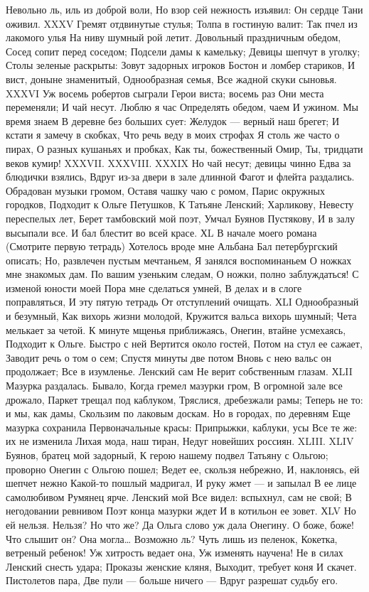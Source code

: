 Невольно ль, иль из доброй воли,
Но взор сей нежность изъявил:
Он сердце Тани оживил.
XXXV
Гремят отдвинутые стулья;
Толпа в гостиную валит:
Так пчел из лакомого улья
На ниву шумный рой летит.
Довольный праздничным обедом,
Сосед сопит перед соседом;
Подсели дамы к камельку;
Девицы шепчут в уголку;
Столы зеленые раскрыты:
Зовут задорных игроков
Бостон и ломбер стариков,
И вист, доныне знаменитый,
Однообразная семья,
Все жадной скуки сыновья.
XXXVI
Уж восемь робертов сыграли
Герои виста; восемь раз
Они места переменяли;
И чай несут. Люблю я час
Определять обедом, чаем
И ужином. Мы время знаем
В деревне без больших сует:
Желудок — верный наш брегет;
И кстати я замечу в скобках,
Что речь веду в моих строфах
Я столь же часто о пирах,
О разных кушаньях и пробках,
Как ты, божественный Омир,
Ты, тридцати веков кумир!
XXXVII. XXXVIII. XXXIX
Но чай несут; девицы чинно
Едва за блюдички взялись,
Вдруг из-за двери в зале длинной
Фагот и флейта раздались.
Обрадован музыки громом,
Оставя чашку чаю с ромом,
Парис окружных городков,
Подходит к Ольге Петушков,
К Татьяне Ленский; Харликову,
Невесту переспелых лет,
Берет тамбовский мой поэт,
Умчал Буянов Пустякову,
И в залу высыпали все.
И бал блестит во всей красе.
ХL
В начале моего романа
(Смотрите первую тетрадь)
Хотелось вроде мне Альбана
Бал петербургский описать;
Но, развлечен пустым мечтаньем,
Я занялся воспоминаньем
О ножках мне знакомых дам.
По вашим узеньким следам,
О ножки, полно заблуждаться!
С изменой юности моей
Пора мне сделаться умней,
В делах и в слоге поправляться,
И эту пятую тетрадь
От отступлений очищать.
ХLI
Однообразный и безумный,
Как вихорь жизни молодой,
Кружится вальса вихорь шумный;
Чета мелькает за четой.
К минуте мщенья приближаясь,
Онегин, втайне усмехаясь,
Подходит к Ольге. Быстро с ней
Вертится около гостей,
Потом на стул ее сажает,
Заводит речь о том о сем;
Спустя минуты две потом
Вновь с нею вальс он продолжает;
Все в изумленье. Ленский сам
Не верит собственным глазам.
ХLII
Мазурка раздалась. Бывало,
Когда гремел мазурки гром,
В огромной зале все дрожало,
Паркет трещал под каблуком,
Тряслися, дребезжали рамы;
Теперь не то: и мы, как дамы,
Скользим по лаковым доскам.
Но в городах, по деревням
Еще мазурка сохранила
Первоначальные красы:
Припрыжки, каблуки, усы
Все те же: их не изменила
Лихая мода, наш тиран,
Недуг новейших россиян.
XLIII. XLIV
Буянов, братец мой задорный,
К герою нашему подвел
Татьяну с Ольгою; проворно
Онегин с Ольгою пошел;
Ведет ее, скользя небрежно,
И, наклонясь, ей шепчет нежно
Какой-то пошлый мадригал,
И руку жмет — и запылал
В ее лице самолюбивом
Румянец ярче. Ленский мой
Все видел: вспыхнул, сам не свой;
В негодовании ревнивом
Поэт конца мазурки ждет
И в котильон ее зовет.
ХLV
Но ей нельзя. Нельзя? Но что же?
Да Ольга слово уж дала
Онегину. О боже, боже!
Что слышит он? Она могла…
Возможно ль? Чуть лишь из пеленок,
Кокетка, ветреный ребенок!
Уж хитрость ведает она,
Уж изменять научена!
Не в силах Ленский снесть удара;
Проказы женские кляня,
Выходит, требует коня
И скачет. Пистолетов пара,
Две пули — больше ничего —
Вдруг разрешат судьбу его.
